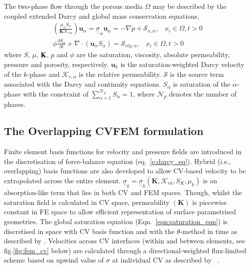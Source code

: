 \documentclass[preprint,authoryear,12pt]{elsarticle}
\begin{document}
\noindent The two-phase flow through the porous media $\Omega$ may be described by the coupled extended Darcy and global mass conservation equations,
\begin{eqnarray}
\left(\displaystyle\frac{\mu_{\alpha}S_{\alpha}}{{\mathbf K}\mathcal{K}_{r\alpha}}\right) {\mathbf u}_{\alpha} = \underline{\underline{\sigma}}_{\alpha} {\mathbf u}_{\alpha} = -\nabla p + \mathcal{S}_{u,\alpha},\;\;\; x_{i}\in\Omega, t>0 \label{eqn:darcy_eqn} \\
\phi\displaystyle\frac{\partial S_{\alpha} }{\partial t} +   \nabla \cdot \left( {\mathbf u}_{\alpha}  S_{\alpha}\right) =  \mathcal{S}_{cty,\alpha},\;\;\; x_{i}\in\Omega, t>0\label{eqn:saturation_eqn}
\end{eqnarray}
where $S$, $\mu$, ${\bf K}$, $p$ and $\phi$ are the saturation, viscosity, absolute permeability, pressure and porosity, respectively. ${\mathbf u}_{k}$ is the saturation-weighted Darcy velocity of the $k$-phase and $\mathcal{K}_{r,\alpha}$ is the relative permeability. $\mathcal{S}$ is the source term associated with the Darcy and continuity equations. $S_{\alpha}$ is saturation of the $\alpha$-phase with the constraint of $\sum\limits_{\alpha=1}^{\mathcal{N}_{p}} S_{\alpha} = 1$, where $\mathcal{N}_{p}$ denotes the number of phases.



\subsection{The Overlapping CVFEM formulation}
\medskip
Finite element basis functions for velocity and pressure fields are introduced in the discretisation of force-balance equation (eq.~\ref{e:darcy_eq}). Hybrid (i.e., overlapping) basis functions are also developed to allow CV-based velocity to be extrapolated across the entire element. $\underline{\underline{\sigma}}_{k}=\underline{\underline{\sigma}}_{k}\left({\mathbf K}, \mathcal{K}_{rk}, S_{K}, \mu_{k}\right)$ is an absorption-like term that lies in both CV and FEM spaces. Though, whilst the saturation field is calculated in CV space, permeability $\left({\mathbf K}\right)$ is piecewise constant in FE space to allow efficient representation of surface parametrised geometries. The global saturation equation (Eqn.~\ref{eqn:saturation_eqn}) is discretised in space with CV basis function and with the $\theta$-method in time as described by \citet{gomes_book_2012}. Velocities across CV interfaces (within and between elements, see fig.\ref{fig:fem_cv} below) are calculated through a directional-weighted flux-limited scheme based on upwind value of $\sigma$ at individual CV as described by \citet{gomes_2013}~\citep[see also][]{jackson_2013}.
\end{document}
